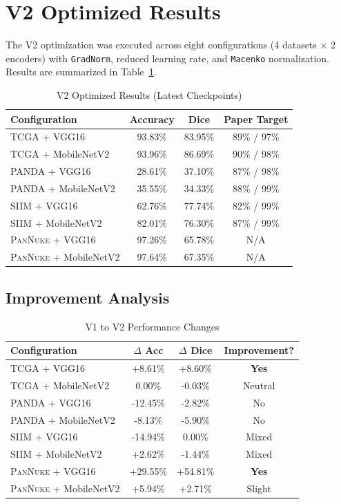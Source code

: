 \documentclass[11pt,a4paper,twoside]{report}
\newcommand{\dataset}[1]{\textsc{#1}}
\newcommand{\model}[1]{\texttt{#1}}
\newcommand{\tabref}[1]{Table~\ref{#1}}
\begin{document}
\section{V2 Optimized Results}

The V2 optimization was executed across eight configurations (4 datasets $\times$ 2 encoders) with \model{GradNorm}, reduced learning rate, and \model{Macenko} normalization. Results are summarized in \tabref{tab:v2_results}.

\begin{table}[htbp]
\centering
\caption{V2 Optimized Results (Latest Checkpoints)}
\label{tab:v2_results}
\begin{tabular}{lccc}
\toprule
\textbf{Configuration} & \textbf{Accuracy} & \textbf{Dice} & \textbf{Paper Target} \\
\midrule
\dataset{TCGA} + VGG16 & 93.83\% & 83.95\% & 89\% / 97\% \\
\dataset{TCGA} + MobileNetV2 & 93.96\% & 86.69\% & 90\% / 98\% \\
\dataset{PANDA} + VGG16 & 28.61\% & 37.10\% & 87\% / 98\% \\
\dataset{PANDA} + MobileNetV2 & 35.55\% & 34.33\% & 88\% / 99\% \\
\dataset{SIIM} + VGG16 & 62.76\% & 77.74\% & 82\% / 99\% \\
\dataset{SIIM} + MobileNetV2 & 82.01\% & 76.30\% & 87\% / 99\% \\
\dataset{PanNuke} + VGG16 & 97.26\% & 65.78\% & N/A \\
\dataset{PanNuke} + MobileNetV2 & 97.64\% & 67.35\% & N/A \\
\bottomrule
\end{tabular}
\end{table}

\subsection{Improvement Analysis}

\begin{table}[htbp]
\centering
\caption{V1 to V2 Performance Changes}
\label{tab:v2_improvements}
\begin{tabular}{lccc}
\toprule
\textbf{Configuration} & $\Delta$ Acc & $\Delta$ Dice & Improvement? \\
\midrule
\dataset{TCGA} + VGG16 & +8.61\% & +8.60\% & \textbf{Yes} \\
\dataset{TCGA} + MobileNetV2 & 0.00\% & -0.03\% & Neutral \\
\dataset{PANDA} + VGG16 & -12.45\% & -2.82\% & No \\
\dataset{PANDA} + MobileNetV2 & -8.13\% & -5.90\% & No \\
\dataset{SIIM} + VGG16 & -14.94\% & 0.00\% & Mixed \\
\dataset{SIIM} + MobileNetV2 & +2.62\% & -1.44\% & Mixed \\
\dataset{PanNuke} + VGG16 & +29.55\% & +54.81\% & \textbf{Yes} \\
\dataset{PanNuke} + MobileNetV2 & +5.94\% & +2.71\% & Slight \\
\bottomrule
\end{tabular}
\end{table}
\end{document}
